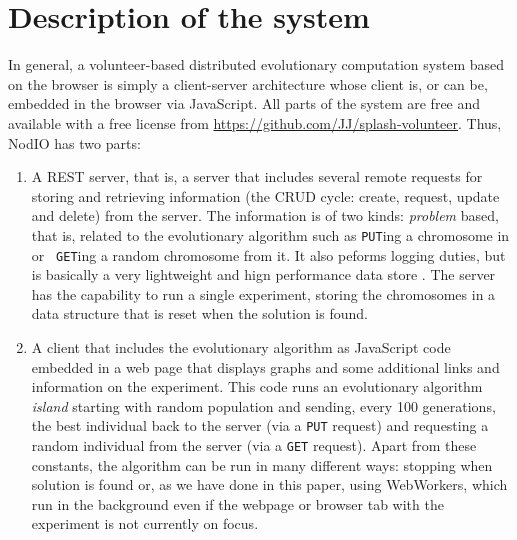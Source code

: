 \documentclass[journal,onecolumn]{IEEEtran}
\begin{document}
\section{Description of the system}
\label{sec:description}

In general, a volunteer-based distributed evolutionary computation
system based on the browser is simply a client-server architecture
whose client is, or can be, embedded in the browser via
JavaScript. All parts of the system are free and available with a free
license from \url{https://github.com/JJ/splash-volunteer}.
Thus, {\sf NodIO} has two parts:\begin{enumerate}
\item A REST server, that is, a server that includes several remote
  requests for storing and retrieving information (the CRUD cycle:
  create, request, update and delete) from the server. The information
  is of two kinds: {\em problem} based, that is, related to the
  evolutionary algorithm such as {\tt PUT}ing a chromosome in or {\tt
    GET}ing a random chromosome from it. It also peforms logging
  duties, but is basically a very lightweight and hign performance
  data store \cite{jj:idc:lowcost}. The server has the capability to
  run a single experiment, storing the chromosomes in a data structure
  that is reset when the solution is found. 
\item A client that includes the evolutionary algorithm as 
  JavaScript code embedded in a web page that displays graphs and some
  additional links and information on the experiment. This code runs
  an evolutionary algorithm {\em island} starting with random
  population and sending, every 100 generations, the best individual
  back to the server (via a {\tt PUT} request) and requesting a random
  individual from the server (via a {\tt GET} request). Apart from
  these constants, the algorithm can be run in many different ways:
  stopping when solution is found or, as we have done in this paper,
  using WebWorkers, which run in the background even if the webpage or
  browser tab with the experiment is not currently on focus.  
\end{enumerate}
\end{document}
